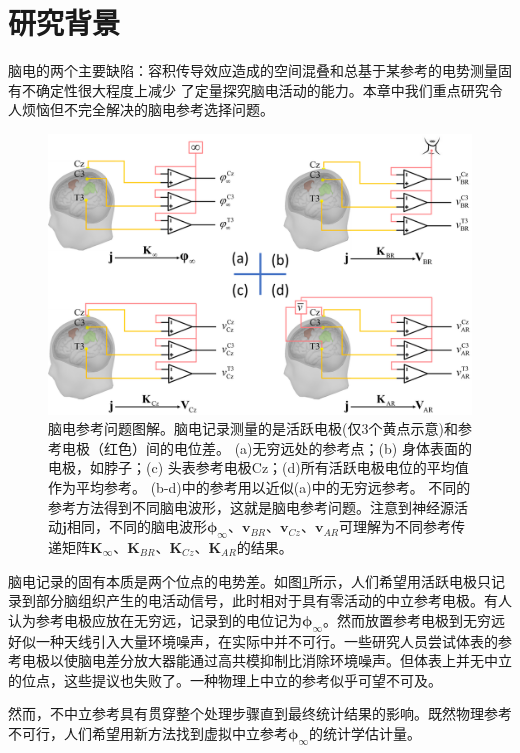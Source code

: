 \section{研究背景}
脑电的两个主要缺陷：容积传导效应造成的空间混叠和总基于某参考的电势测量固有不确定性很大程度上减少
了定量探究脑电活动的能力。本章中我们重点研究令人烦恼但不完全解决的脑电参考选择问题。
\begin{figure}[!h]
	\centering
	\includegraphics[width=15cm]{pic/Frontier/figure1.png}
	\caption{脑电参考问题图解。脑电记录测量的是活跃电极(仅3个黄点示意)和参考电极（红色）间的电位差。 (a)无穷远处的参考点；(b) 身体表面的电极，如脖子；(c) 头表参考电极Cz；(d)所有活跃电极电位的平均值作为平均参考。 (b-d)中的参考用以近似(a)中的无穷远参考。 不同的参考方法得到不同脑电波形，这就是脑电参考问题。注意到神经源活动$\mathbf{j}$相同，不同的脑电波形$\mathbf{\phi}_\infty、\mathbf{v}_{BR}、\mathbf{v}_{Cz}、\mathbf{v}_{AR}$可理解为不同参考传递矩阵$\mathbf{K}_\infty、\mathbf{K}_{BR}、\mathbf{K}_{Cz}、\mathbf{K}_{AR}$的结果。}
	\label{3.1}
\end{figure}
脑电记录的固有本质是两个位点的电势差。如图\ref{3.1}所示，人们希望用活跃电极只记录到部分脑组织产生的电活动信号，此时相对于具有零活动的中立参考电极。有人认为参考电极应放在无穷远，记录到的电位记为$\mathbf{\phi}_{\infty}$。然而放置参考电极到无穷远好似一种天线引入大量环境噪声，在实际中并不可行。一些研究人员尝试体表的参考电极以使脑电差分放大器能通过高共模抑制比消除环境噪声。但体表上并无中立的位点，这些提议也失败了。一种物理上中立的参考似乎可望不可及。

然而，不中立参考具有贯穿整个处理步骤直到最终统计结果的影响。既然物理参考不可行，人们希望用新方法找到虚拟中立参考$\mathbf{\phi}_{\infty}$的统计学估计量。

